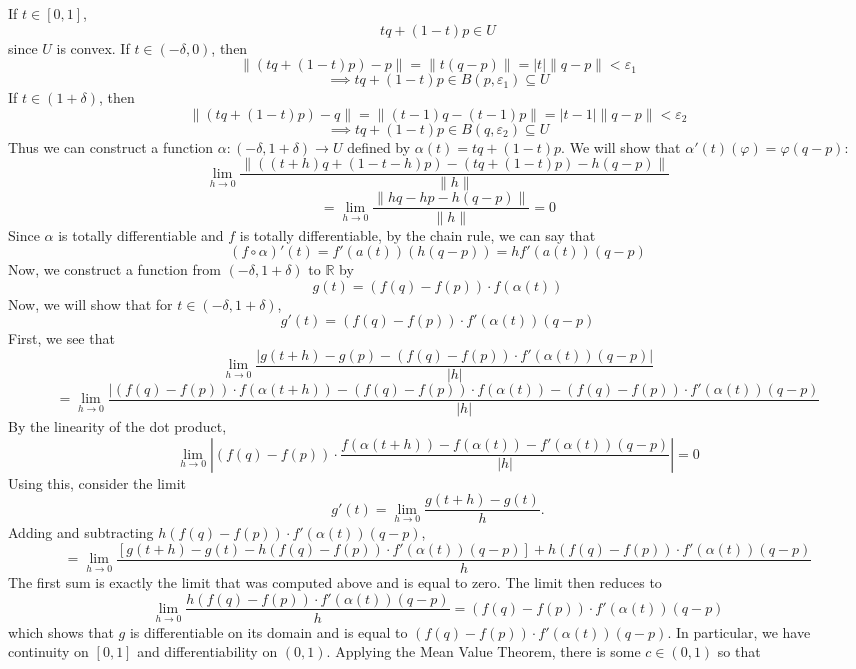 \documentclass{article}
\theoremstyle{plain} %
\numberwithin{thm}{section} %
\theoremstyle{definition}
\begin{document}
\begin{question}{25}
    If \(t \in [0,1]\),
    \[
        tq + (1-t)p \in U
    \]
    since \(U\) is convex. If \(t \in (-\delta , 0)\), then
    \[
        \|(tq + (1-t)p) - p\| = \|t(q-p)\| = |t|\|q-p\| < \varepsilon_1
    \]
    \[
        \implies tq + (1-t)p \in B(p, \varepsilon_1) \subseteq U
    \]
    If \(t \in (1 + \delta)\), then
    \[
        \|(tq + (1-t)p) - q\| = \|(t-1)q - (t-1)p\| = |t-1|\|q-p\| < \varepsilon_2
    \]
    \[
        \implies tq + (1-t)p \in B(q, \varepsilon_2) \subseteq U
    \]
    Thus we can construct a function \(\alpha : (-\delta, 1 + \delta) \to U\) defined by \(\alpha (t) = tq + (1-t)p\). We will show that \(\alpha '(t)(\varphi) = \varphi (q-p)\):
    \[
        \lim_{h \to 0} \frac{\|((t+h)q + (1-t-h)p) - (tq + (1-t)p) - h(q-p)\|}{\|h\|}
    \]
    \[
        = \lim_{h \to 0} \frac{\|hq -hp - h(q-p)\|}{\|h\|} = 0
    \]
    Since \(\alpha\) is totally differentiable and \(f\) is totally differentiable, by the chain rule, we can say that
    \[
        (f \circ \alpha)'(t) = f'(a(t))(h(q-p)) = hf'(a(t))(q-p)
    \]
    Now, we construct a function from \((-\delta, 1 + \delta)\) to \(\mathbb{R}\) by
    \[
        g(t) = (f(q) - f(p)) \cdot f(\alpha (t))
    \]
    Now, we will show that for \(t \in (-\delta , 1 + \delta)\),
    \[
        g'(t) = (f(q) - f(p)) \cdot f'(\alpha (t))(q-p)
    \]
    First, we see that
    \[
        \lim_{h \to 0} \frac{|g(t+h) - g(p) - (f(q) - f(p)) \cdot f'(\alpha (t))(q-p)|}{|h|}
    \]
    \[
        = \lim_{h \to 0} \frac{|(f(q) - f(p)) \cdot f(\alpha (t+h)) - (f(q) - f(p)) \cdot f(\alpha (t)) - (f(q) - f(p)) \cdot f'(\alpha (t))(q-p)}{|h|}
    \]
    By the linearity of the dot product,
    \[
        \lim_{h \to 0} \left\vert (f(q) - f(p)) \cdot \frac{f(\alpha (t+h)) - f(\alpha (t)) - f'(\alpha (t))(q-p)}{|h|} \right\vert = 0
    \]
    Using this, consider the limit
    \[
        g'(t) = \lim_{h \to 0} \frac{g(t+h) - g(t)}{h} \text{.} 
    \]
    Adding and subtracting \(h(f(q) - f(p)) \cdot f'(\alpha (t))(q-p)\),
    \[
        = \lim_{h \to 0} \frac{[g(t+h) - g(t) - h(f(q) - f(p)) \cdot f'(\alpha (t))(q-p)] + h(f(q) - f(p)) \cdot f'(\alpha (t))(q-p)}{h}
    \]
    The first sum is exactly the limit that was computed above and is equal to zero. The limit then reduces to
    \[
        \lim_{h \to 0} \frac{h(f(q) - f(p)) \cdot f'(\alpha (t))(q-p)}{h} = (f(q) - f(p)) \cdot f'(\alpha (t))(q-p)
    \]
    which shows that \(g\) is differentiable on its domain and is equal to \((f(q) - f(p)) \cdot f'(\alpha (t))(q-p)\). In particular, we have continuity on \([0,1]\) and differentiability on \((0,1)\). Applying the Mean Value Theorem, there is some \(c \in (0,1)\) so that

\end{question}
\end{document}
